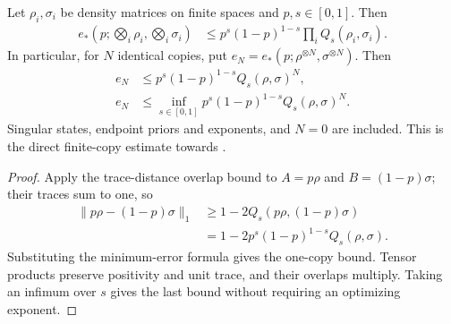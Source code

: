 \begin{theorem}
    \label{thm:finite_copy_chernoff}
    \leanok
    Let $\rho_i,\sigma_i$ be density matrices on finite spaces and
    $p,s\in[0,1]$. Then
    \begin{align}
        e_*\left(p;\bigotimes_i\rho_i,\bigotimes_i\sigma_i\right)
          &\le p^s(1-p)^{1-s}\prod_i Q_s(\rho_i,\sigma_i).
        \label{eq:finite_copy_chernoff}
    \end{align}
    In particular, for $N$ identical copies, put
    $e_N=e_*(p;\rho^{\otimes N},\sigma^{\otimes N})$. Then
    \begin{align}
        e_N&\le p^s(1-p)^{1-s}Q_s(\rho,\sigma)^N,\\
        e_N&\le\inf_{s\in[0,1]}p^s(1-p)^{1-s}Q_s(\rho,\sigma)^N.
    \end{align}
    Singular states, endpoint priors and exponents, and $N=0$ are included.
    This is the direct finite-copy estimate towards
    \cite[Equation~(8.44)]{Wolf2012Quantum}.
\end{theorem}
\begin{proof}
    \leanok
    Apply the trace-distance overlap bound to $A=p\rho$ and $B=(1-p)\sigma$;
    their traces sum to one, so
    \begin{align}
        \|p\rho-(1-p)\sigma\|_1
        &\ge 1-2Q_s(p\rho,(1-p)\sigma)\\
        &=1-2p^s(1-p)^{1-s}Q_s(\rho,\sigma).
    \end{align}
    Substituting the minimum-error formula gives the one-copy bound. Tensor products preserve positivity and unit trace,
    and their overlaps multiply. Taking an infimum over $s$ gives the last bound
    without requiring an optimizing exponent.
\end{proof}

